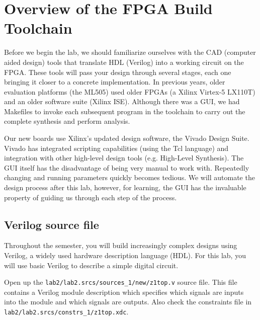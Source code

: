 \documentclass[11pt]{article}
\begin{document}

\section{Overview of the FPGA Build Toolchain}

Before we begin the lab, we should familiarize ourselves with the CAD (computer aided design) tools that translate HDL (Verilog) into a working circuit on the FPGA.
These tools will pass your design through several stages, each one bringing it closer to a concrete implementation.
In previous years, older evaluation platforms (the ML505) used older FPGAs (a Xilinx Virtex-5 LX110T) and an older software suite (Xilinx ISE).
Although there was a GUI, we had Makefiles to invoke each subsequent program in the toolchain to carry out the complete synthesis and perform analysis.

Our new boards use Xilinx's updated design software, the Vivado Design Suite.
Vivado has integrated scripting capabilities (using the Tcl language) and integration with other high-level design tools (e.g. High-Level Synthesis).
The GUI itself has the disadvantage of being very manual to work with.
Repeatedly changing and running parameters quickly becomes tedious.
We will automate the design process after this lab, however, for learning, the GUI has the invaluable property of guiding us through each step of the process.


\subsection{Verilog source file}
Throughout the semester, you will build increasingly complex designs using Verilog, a widely used hardware description language (HDL). For this lab, you will use basic Verilog to describe a simple digital circuit.

Open up the \verb|lab2/lab2.srcs/sources_1/new/z1top.v| source file.
This file contains a Verilog module description which specifies which signals are inputs into the module and which signals are outputs.
Also check the constraints file in \verb|lab2/lab2.srcs/constrs_1/z1top.xdc|.
\end{document}
